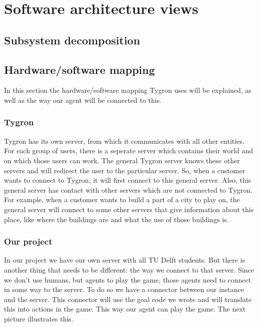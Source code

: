 \section{Software architecture views}
\subsection{Subsystem decomposition}

\newpage
\subsection{Hardware/software mapping}
In this section the hardware/software mapping Tygron uses will be explained, as well as the way our agent will be connected to this.

\subsubsection{Tygron}
Tygron has its own server, from which it communicates with all other entities. For each group of users, there is a seperate server which contains their world and on which those users can work. The general Tygron server knows these other servers and will redirect the user to the particular server. So, when a customer wants to connect to Tygron, it will first connect to this general server. Also, this general server has contact with other servers which are not connected to Tygron. For example, when a customer wants to build a part of a city to play on, the general server will connect to some other servers that give information about this place, like where the buildings are and what the use of those buildings is. 

\subsubsection{Our project}
In our project we have our own server with all TU Delft students. But there is another thing that needs to be different: the way we connect to that server. Since we don't use humans, but agents to play the game, those agents need to connect in some way to the server. To do so we have a connector between our instance and the server. This connector will use the goal code we wrote and will translate this into actions in the game. This way our agent can play the game. The next picture illustrates this.

